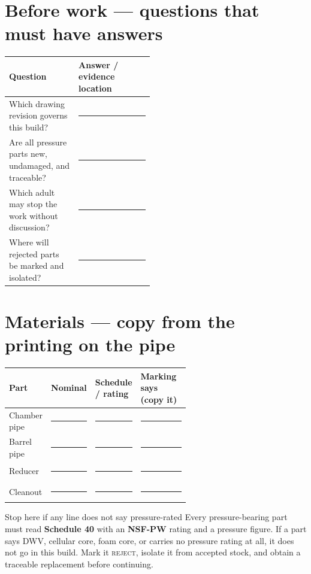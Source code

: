 \section{Before work --- questions that must have answers}
\begin{tabularx}{\linewidth}{@{}p{0.48\linewidth}L@{}}
\toprule
\textbf{Question} & \textbf{Answer / evidence location}\\
\midrule
Which drawing revision governs this build? & \rule{0.86\linewidth}{0.4pt}\\[0.55em]
Are all pressure parts new, undamaged, and traceable? & \rule{0.86\linewidth}{0.4pt}\\[0.55em]
Which adult may stop the work without discussion? & \rule{0.86\linewidth}{0.4pt}\\[0.55em]
Where will rejected parts be marked and isolated? & \rule{0.86\linewidth}{0.4pt}\\
\bottomrule
\end{tabularx}

\section{Materials --- copy from the printing on the pipe}
\begin{tabularx}{\linewidth}{@{}p{0.20\linewidth}p{0.16\linewidth}p{0.24\linewidth}L@{}}
\toprule
\textbf{Part} & \textbf{Nominal} & \textbf{Schedule / rating} & \textbf{Marking says (copy it)}\\
\midrule
Chamber pipe & \rule{0.8\linewidth}{0.4pt} & \rule{0.8\linewidth}{0.4pt} & \rule{0.9\linewidth}{0.4pt}\\[0.6em]
Barrel pipe & \rule{0.8\linewidth}{0.4pt} & \rule{0.8\linewidth}{0.4pt} & \rule{0.9\linewidth}{0.4pt}\\[0.6em]
Reducer & \rule{0.8\linewidth}{0.4pt} & \rule{0.8\linewidth}{0.4pt} & \rule{0.9\linewidth}{0.4pt}\\[0.6em]
Cleanout & \rule{0.8\linewidth}{0.4pt} & \rule{0.8\linewidth}{0.4pt} & \rule{0.9\linewidth}{0.4pt}\\
\bottomrule
\end{tabularx}

\begin{gate}{Stop here if any line does not say pressure-rated}
Every pressure-bearing part must read \textbf{Schedule 40} with an
\textbf{NSF-PW} rating and a pressure figure. If a part says DWV, cellular core,
foam core, or carries no pressure rating at all, it does not go in this build.
Mark it \textsc{reject}, isolate it from accepted stock, and obtain a traceable
replacement before continuing.
\end{gate}

